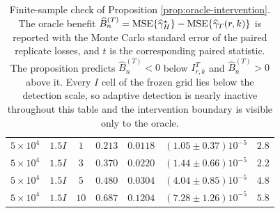 \begin{table}[H]
\begin{tabular}{ccccccc}
$5{\times}10^4$ & $1.5I$ & $1$ & $0.213$ & $0.0118$ & $(1.05\pm0.37)10^{-5}$ & $2.8$\\
$5{\times}10^4$ & $1.5I$ & $3$ & $0.370$ & $0.0220$ & $(1.44\pm0.66)10^{-5}$ & $2.2$\\
$5{\times}10^4$ & $1.5I$ & $5$ & $0.480$ & $0.0304$ & $(4.04\pm0.85)10^{-5}$ & $4.8$\\
$5{\times}10^4$ & $1.5I$ & $10$ & $0.687$ & $0.1204$ & $(7.28\pm1.26)10^{-5}$ & $5.8$\\
\bottomrule
\end{tabular}
\caption{Finite-sample check of Proposition \ref{prop:oracle-intervention}.  The oracle benefit $\widehat B_n^{(T)}=\operatorname{MSE}\{\widehat{\gamma}_H^\star\}-\operatorname{MSE}\{\widehat{\gamma}_T(r,k)\}$ is reported with the Monte Carlo standard error of the paired replicate losses, and $t$ is the corresponding paired statistic.  The proposition predicts $\widehat B_n^{(T)}<0$ below $I^{T}_{r,k}$ and $\widehat B_n^{(T)}>0$ above it.  Every $I$ cell of the frozen grid lies below the detection scale, so adaptive detection is nearly inactive throughout this table and the intervention boundary is visible only to the oracle.}
\label{tab:intervention}
\end{table}

